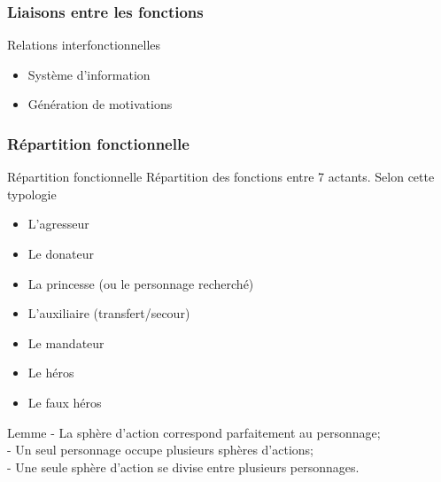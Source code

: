 \documentclass{beamer}
\begin{document}
\subsubsection{Liaisons entre les fonctions}
\begin{frame}{Relations interfonctionnelles}
  \begin{itemize}
    \item Système d'information
    \item Génération de motivations
  \end{itemize}
\end{frame}

\subsubsection{Répartition fonctionnelle}
\begin{frame}{Répartition fonctionnelle}
  Répartition des fonctions entre 7 actants. Selon cette typologie
  \begin{itemize}
    \item L'agresseur
    \item Le donateur
    \item La princesse (ou le personnage recherché)
    \item L'auxiliaire (transfert/secour)
    \item Le mandateur 
    \item Le héros
    \item Le faux héros
  \end{itemize}
  \begin{block}{Lemme}
   - La sphère d'action correspond parfaitement au personnage;\\
   - Un seul personnage occupe plusieurs sphères d'actions;\\
   - Une seule sphère d'action se divise entre plusieurs personnages.\\
  \end{block}
\end{frame}
\end{document}
